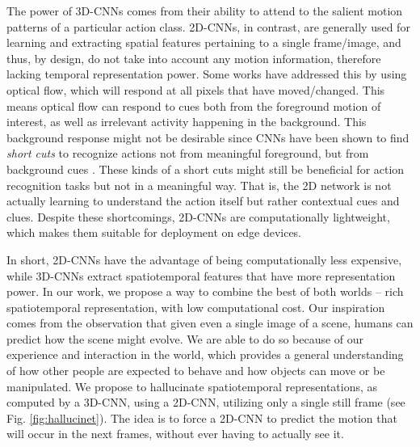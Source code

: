 \documentclass[10pt,twocolumn,letterpaper]{article}
\begin{document}
The power of 3D-CNNs comes from their ability to attend to the salient motion patterns of a particular action class.  2D-CNNs, in contrast, are generally used for learning and extracting spatial features pertaining to a single frame/image, and thus, by design, do not take into account any motion information, therefore lacking temporal representation power. Some works \cite{walker2014patch, walker, pintea2014deja, im2flow} have addressed this by using optical flow, which will respond at all pixels that have moved/changed. This means optical flow can respond to cues both from the foreground motion of interest, as well as irrelevant activity happening in the background. This background response might not be desirable since CNNs have been shown to find \textit{short cuts} to recognize actions not from meaningful foreground, but from background cues \cite{sports1m, ar_wo_human}. These kinds of a short cuts might still be beneficial for action recognition tasks but not in a meaningful way.  That is, the 2D network is not actually learning to understand the action itself but rather contextual cues and clues.  Despite these shortcomings, 2D-CNNs are computationally lightweight, which makes them suitable for deployment on edge devices. 

In short, 2D-CNNs have the advantage of being computationally less expensive, while 3D-CNNs extract spatiotemporal features that have more representation power. In our work, we propose a way to combine the best of both worlds -- rich spatiotemporal representation, with low computational cost. Our inspiration comes from the observation that given even a single image of a scene, humans can predict how the scene might evolve. We are able to do so because of our experience and interaction in the world, which provides a general understanding of how other people are expected to behave and how objects can move or be manipulated. We propose to hallucinate spatiotemporal representations, as computed by a 3D-CNN, using a 2D-CNN, utilizing only a single still frame (see Fig. \ref{fig:hallucinet}). The idea is to force a 2D-CNN to predict the motion that will occur in the next frames, without ever having to actually see it.
\end{document}
